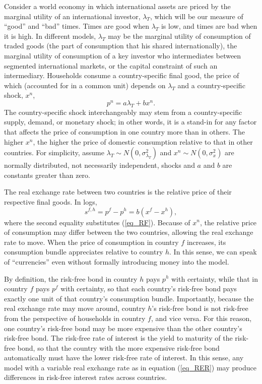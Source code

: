 \documentclass{ar-1col}
\begin{document}
Consider a world economy in which international assets
are priced by the marginal utility of an international investor, $\lambda_T$, which will be our measure of ``good'' and ``bad'' times. Times are good when $\lambda_T$ is low, and times are bad when it is high. In different models, $\lambda_T$ may be the marginal utility of consumption of traded goods (the part of consumption that his shared internationally), the marginal utility of consumption of a key investor who intermediates between segmented international markets, or the capital constraint of such an intermediary. 
Households consume a country-specific final good, the price of which (accounted for in
a common unit) depends on $\lambda_T$ and a country-specific shock,
$x^n$,
\begin{equation}
  p^{n}=a\lambda _{T}+b x^{n}.  \label{eq_RF}
\end{equation}%
The country-specific shock
interchangeably may stem from a country-specific supply, demand, or monetary shock; in
other words, it is a stand-in for any factor that affects the price of
consumption in one country more than in others. The higher $x^{n}$,
the higher the price of domestic consumption relative to that in other countries. 
For simplicity, assume $\lambda _{T}\sim N(0,\sigma^2_{\lambda_{T}})$ and
$x^{n} \sim N(0,\sigma^2_x) $ are normally distributed, not
necessarily independent, shocks and $a$ and $b$ are constants greater
than zero.

The real exchange rate between two countries is the relative price of
their respective final goods. In logs,
\begin{equation}\label{eq_RER}
  s^{f,h}=p^{f}-p^{h}=b(x^{f}-x^{h}),
\end{equation}
where the second equality substitutes (\ref{eq_RF}).
Because of $x^{n}$, the relative price of consumption may differ between the two countries, allowing the real exchange rate to move. When the price of consumption in country $f$ increases, its consumption bundle appreciates relative to country $h$. In this sense, we can speak of ``currencies'' even without formally introducing money into the model. 

By definition, the risk-free bond in country $h$ pays $p^h$ with certainty, while that in country $f$ pays $p^f$ with certainty, so that each country's risk-free bond pays exactly one unit of that country's consumption bundle. Importantly, because the real exchange rate may move around, country $h$'s risk-free bond is not risk-free from the perspective of households in country $f$, and vice versa. For this reason, one country's risk-free bond may be more expensive than the other country's risk-free bond. The risk-free rate of interest is the yield to maturity of the risk-free bond, so that the country with the more expensive risk-free bond automatically must have the lower risk-free rate of interest. In this sense, any model with a variable real exchange rate as in equation (\ref{eq_RER}) may produce differences in risk-free interest rates across countries.
\end{document}
